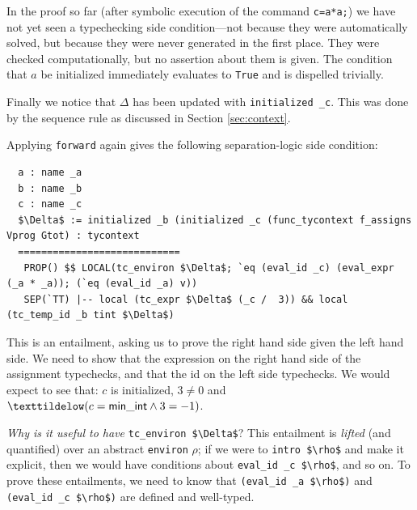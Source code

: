 \documentclass{puthesis}
\begin{document}
In the proof so far (after symbolic execution of the
command \lstinline{c=a*a;})
we have not yet seen a typechecking side condition---not 
because they were automatically
solved, but because they were never generated in the first place. They were checked
computationally, but no assertion about them is given. The condition that $a$ be
initialized immediately evaluates to \lstinline|True| and is dispelled trivially.  

Finally we notice that $\Delta$ has been updated with 
\lstinline|initialized _c|. This was done by the sequence rule as discussed in
Section \ref{sec:context}.

Applying \lstinline|forward| again gives 
the following separation-logic side condition: 

\begin{lstlisting}
  a : name _a
  b : name _b
  c : name _c
  $\Delta$ := initialized _b (initialized _c (func_tycontext f_assigns Vprog Gtot) : tycontext 
  ============================
   PROP() $$ LOCAL(tc_environ $\Delta$; `eq (eval_id _c) (eval_expr (_a * _a)); (`eq (eval_id _a) v)) 
   SEP(`TT) |-- local (tc_expr $\Delta$ (_c /  3)) && local (tc_temp_id _b tint $\Delta$)
\end{lstlisting}
\noindent This is an entailment, asking us to prove the right hand side given
the left hand side. We need to show that the expression on the right hand side
of the assignment typechecks, and that the id on the left side typechecks. We
would expect to see that: $c$ is initialized, $3\neq 0$ and
$\texttildelow(c=\mathsf{min\_int} \wedge 3 = -1)$.

\emph{Why is it useful to have} \lstinline{tc_environ $\Delta$}?
This entailment is \emph{lifted} (and quantified) over an abstract
\lstinline|environ| $\rho$; if we were to \lstinline|intro $\rho$| and make it
explicit, then we would have conditions about \lstinline{eval_id _c $\rho$},
and so on.  
To prove these entailments, we need to know that
\lstinline{(eval_id _a $\rho$)}  and 
\lstinline{(eval_id _c $\rho$)}  are defined and well-typed.
\end{document}
